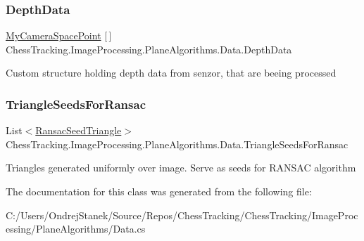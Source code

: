 \subsubsection{\texorpdfstring{DepthData}{DepthData}}
{\footnotesize\ttfamily \mbox{\hyperlink{struct_chess_tracking_1_1_image_processing_1_1_plane_algorithms_1_1_my_camera_space_point}{My\+Camera\+Space\+Point}} \mbox{[}$\,$\mbox{]} Chess\+Tracking.\+Image\+Processing.\+Plane\+Algorithms.\+Data.\+Depth\+Data}



Custom structure holding depth data from senzor, that are beeing processed 

\mbox{\label{class_chess_tracking_1_1_image_processing_1_1_plane_algorithms_1_1_data_ad9deed9c86fed79de5b12695c403e72b}} 
\subsubsection{\texorpdfstring{TriangleSeedsForRansac}{TriangleSeedsForRansac}}
{\footnotesize\ttfamily List$<$\mbox{\hyperlink{class_chess_tracking_1_1_image_processing_1_1_plane_algorithms_1_1_ransac_seed_triangle}{Ransac\+Seed\+Triangle}}$>$ Chess\+Tracking.\+Image\+Processing.\+Plane\+Algorithms.\+Data.\+Triangle\+Seeds\+For\+Ransac}



Triangles generated uniformly over image. Serve as seeds for R\+A\+N\+S\+AC algorithm 



The documentation for this class was generated from the following file\+:\begin{DoxyCompactItemize}
\item 
C\+:/\+Users/\+Ondrej\+Stanek/\+Source/\+Repos/\+Chess\+Tracking/\+Chess\+Tracking/\+Image\+Processing/\+Plane\+Algorithms/Data.\+cs\end{DoxyCompactItemize}
